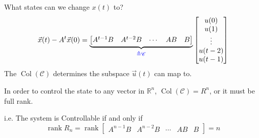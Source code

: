\begin{frame}{What states can we change \(x(t)\) to?}
    \[
        \vec x(t) - A^t \vec x(0) =
        \underbrace{\begin{bmatrix}
            A^{t - 1} B & A^{t -2} B & \cdots & AB & B
        \end{bmatrix}}_{\color{blue}\triangleq \mathscr{C}}
        \begin{bmatrix}
            u(0) \\
            u(1) \\
            \vdots \\
            u(t -2) \\
            u(t -1) \\
        \end{bmatrix}
    \]
    \providecommand{\Col}{\operatorname{Col}}
    \providecommand{\rank}{\operatorname{rank}}
    The \(\Col(\mathscr{C})\) determines the subspace \(\vec u(t)\) can map to.

    In order to control the state to any vector in \(\mathbb R^n\), \(\Col(\mathscr{C}) = R^n\), or it must be full rank.

    i.e. The system is Controllable if and only if
    \[
        \rank{R_n} = \rank\begin{bmatrix}
            A^{n - 1} B & A^{n -2} B & \cdots & AB & B
        \end{bmatrix} = n
    \]

\end{frame}
